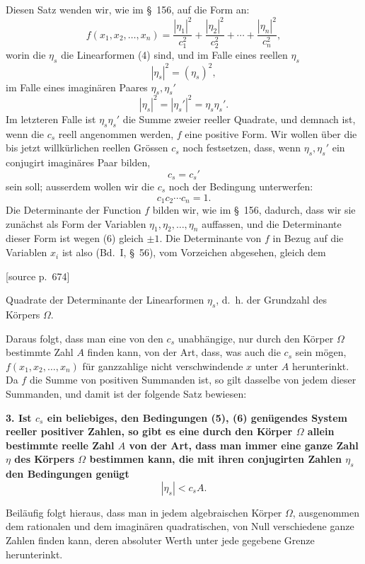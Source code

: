 \documentclass[11pt]{article}
\newcommand{\srcpage}[1]{\par\medskip\noindent\textsf{[source p.~#1]}\par\smallskip}
\begin{document}
Diesen Satz wenden wir, wie im \S~156, auf die Form an:
\[
f(x_1,x_2,\ldots,x_n)=\frac{|\eta_1|^2}{c_1^2}+\frac{|\eta_2|^2}{c_2^2}+\cdots+\frac{|\eta_n|^2}{c_n^2},
\]
worin die $\eta_s$ die Linearformen (4) sind, und im Falle eines reellen $\eta_s$
\[
|\eta_s|^2=(\eta_s)^2,
\]
im Falle eines imaginären Paares $\eta_s,\eta_s'$
\[
|\eta_s|^2=|\eta_s'|^2=\eta_s\eta_s'.
\]
Im letzteren Falle ist $\eta_s\eta_s'$ die Summe zweier reeller Quadrate, und demnach ist, wenn die $c_s$ reell angenommen werden, $f$ eine positive Form. Wir wollen über die bis jetzt willkürlichen reellen Grössen $c_s$ noch festsetzen, dass, wenn $\eta_s,\eta_s'$ ein conjugirt imaginäres Paar bilden,
\begin{equation}
c_s=c_s'
\tag{5}
\end{equation}
sein soll; ausserdem wollen wir die $c_s$ noch der Bedingung unterwerfen:
\begin{equation}
c_1c_2\cdots c_n=1.
\tag{6}
\end{equation}
Die Determinante der Function $f$ bilden wir, wie im \S~156, dadurch, dass wir sie zunächst als Form der Variablen $\eta_1,\eta_2,\ldots,\eta_n$ auffassen, und die Determinante dieser Form ist wegen (6) gleich $\pm1$. Die Determinante von $f$ in Bezug auf die Variablen $x_i$ ist also (Bd.~I, \S~56), vom Vorzeichen abgesehen, gleich dem
\srcpage{674}
Quadrate der Determinante der Linearformen $\eta_s$, d.~h. der Grundzahl des Körpers $\Omega$.

Daraus folgt, dass man eine von den $c_s$ unabhängige, nur durch den Körper $\Omega$ bestimmte Zahl $A$ finden kann, von der Art, dass, was auch die $c_s$ sein mögen, $f(x_1,x_2,\ldots,x_n)$ für ganzzahlige nicht verschwindende $x$ unter $A$ herunterinkt. Da $f$ die Summe von positiven Summanden ist, so gilt dasselbe von jedem dieser Summanden, und damit ist der folgende Satz bewiesen:

\textbf{3. Ist $c_s$ ein beliebiges, den Bedingungen (5), (6) genügendes System reeller positiver Zahlen, so gibt es eine durch den Körper $\Omega$ allein bestimmte reelle Zahl $A$ von der Art, dass man immer eine ganze Zahl $\eta$ des Körpers $\Omega$ bestimmen kann, die mit ihren conjugirten Zahlen $\eta_s$ den Bedingungen genügt}
\begin{equation}
|\eta_s|<c_sA.
\tag{7}
\end{equation}

Beiläufig folgt hieraus, dass man in jedem algebraischen Körper $\Omega$, ausgenommen dem rationalen und dem imaginären quadratischen, von Null verschiedene ganze Zahlen finden kann, deren absoluter Werth unter jede gegebene Grenze herunterinkt.
\end{document}
